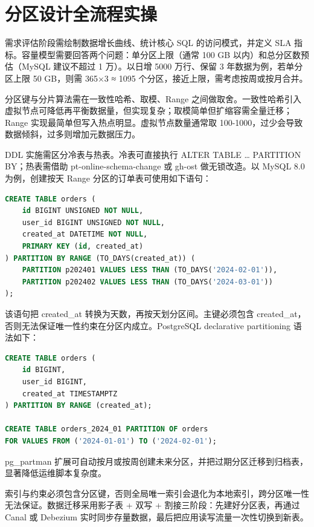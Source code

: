 \chapter{分区设计全流程实操}
需求评估阶段需绘制数据增长曲线、统计核心 SQL 的访问模式，并定义 SLA 指标。容量模型需要回答两个问题：单分区上限（通常 100 GB 以内）和总分区数预估（MySQL 建议不超过 1 万）。以日增 5000 万行、保留 3 年数据为例，若单分区上限 50 GB，则需 365×3 ≈ 1095 个分区，接近上限，需考虑按周或按月合并。\par
分区键与分片算法需在一致性哈希、取模、Range 之间做取舍。一致性哈希引入虚拟节点可降低再平衡数据量，但实现复杂；取模简单但扩缩容需全量迁移；Range 实现最简单但写入热点明显。虚拟节点数量通常取 100-1000，过少会导致数据倾斜，过多则增加元数据压力。\par
DDL 实施需区分冷表与热表。冷表可直接执行 ALTER TABLE … PARTITION BY；热表需借助 pt-online-schema-change 或 gh-ost 做无锁改造。以 MySQL 8.0 为例，创建按天 Range 分区的订单表可使用如下语句：\par
\begin{lstlisting}[language=sql]
CREATE TABLE orders (
    id BIGINT UNSIGNED NOT NULL,
    user_id BIGINT UNSIGNED NOT NULL,
    created_at DATETIME NOT NULL,
    PRIMARY KEY (id, created_at)
) PARTITION BY RANGE (TO_DAYS(created_at)) (
    PARTITION p202401 VALUES LESS THAN (TO_DAYS('2024-02-01')),
    PARTITION p202402 VALUES LESS THAN (TO_DAYS('2024-03-01'))
);
\end{lstlisting}
该语句把 created\_{}at 转换为天数，再按天划分区间。主键必须包含 created\_{}at，否则无法保证唯一性约束在分区内成立。PostgreSQL declarative partitioning 语法如下：\par
\begin{lstlisting}[language=sql]
CREATE TABLE orders (
    id BIGINT,
    user_id BIGINT,
    created_at TIMESTAMPTZ
) PARTITION BY RANGE (created_at);

CREATE TABLE orders_2024_01 PARTITION OF orders
FOR VALUES FROM ('2024-01-01') TO ('2024-02-01');
\end{lstlisting}
pg\_{}partman 扩展可自动按月或按周创建未来分区，并把过期分区迁移到归档表，显著降低运维脚本复杂度。\par
索引与约束必须包含分区键，否则全局唯一索引会退化为本地索引，跨分区唯一性无法保证。数据迁移采用影子表 + 双写 + 割接三阶段：先建好分区表，再通过 Canal 或 Debezium 实时同步存量数据，最后把应用读写流量一次性切换到新表。\par
